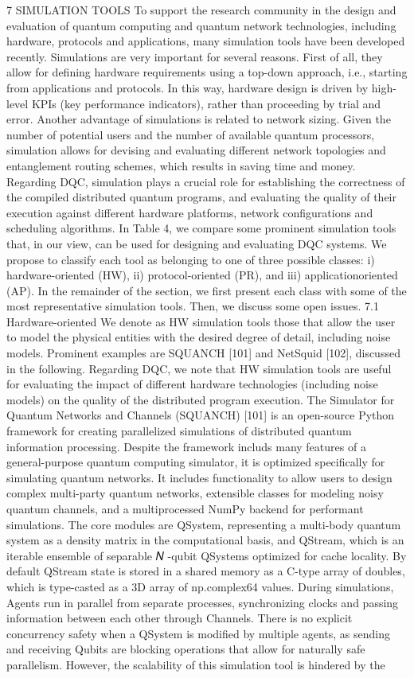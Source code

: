 7 SIMULATION TOOLS To support the research community in the design and evaluation of quantum computing and quantum network technologies, including hardware, protocols and applications, many simulation tools have been developed recently. Simulations are very important for several reasons. First of all, they allow for defining hardware requirements using a top-down approach, i.e., starting from applications and protocols. In this way, hardware design is driven by high-level KPIs (key performance indicators), rather than proceeding by trial and error. Another advantage of simulations is related to network sizing. Given the number of potential users and the number of available quantum processors, simulation allows for devising and evaluating different network topologies and entanglement routing schemes, which results in saving time and money. Regarding DQC, simulation plays a crucial role for establishing the correctness of the compiled distributed quantum programs, and evaluating the quality of their execution against different hardware platforms, network configurations and scheduling algorithms. In Table 4, we compare some prominent simulation tools that, in our view, can be used for designing and evaluating DQC systems. We propose to classify each tool as belonging to one of three possible classes: i) hardware-oriented (HW), ii) protocol-oriented (PR), and iii) applicationoriented (AP). In the remainder of the section, we first present each class with some of the most representative simulation tools. Then, we discuss some open issues. 7.1 Hardware-oriented We denote as HW simulation tools those that allow the user to model the physical entities with the desired degree of detail, including noise models. Prominent examples are SQUANCH [101] and NetSquid [102], discussed in the following. Regarding DQC, we note that HW simulation tools are useful for evaluating the impact of different hardware technologies (including noise models) on the quality of the distributed program execution. The Simulator for Quantum Networks and Channels (SQUANCH) [101] is an open-source Python framework for creating parallelized simulations of distributed quantum information processing. Despite the framework includs many features of a general-purpose quantum computing simulator, it is optimized specifically for simulating quantum networks. It includes functionality to allow users to design complex multi-party quantum networks, extensible classes for modeling noisy quantum channels, and a multiprocessed NumPy backend for performant simulations. The core modules are QSystem, representing a multi-body quantum system as a density matrix in the computational basis, and QStream, which is an iterable ensemble of separable 𝑁 -qubit QSystems optimized for cache locality. By default QStream state is stored in a shared memory as a C-type array of doubles, which is type-casted as a 3D array of np.complex64 values. During simulations, Agents run in parallel from separate processes, synchronizing clocks and passing information between each other through Channels. There is no explicit concurrency safety when a QSystem is modified by multiple agents, as sending and receiving Qubits are blocking operations that allow for naturally safe parallelism. However, the scalability of this simulation tool is hindered by the 